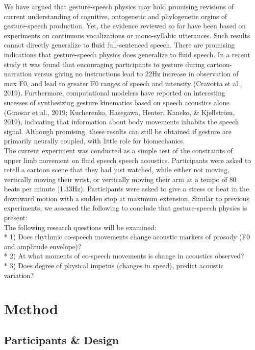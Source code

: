 \documentclass[
  man, noextraspace,floatsintext]{apa6}
\begin{document}
We have argued that gesture-speech physics may hold promising revisions of current understanding of cognitive, ontogenetic and phylogenetic orgins of gesture-speech production. Yet, the evidence reviewed so far have been based on experiments on continuous vocalizations or mono-syllabic utterances. Such results cannot directly generalize to fluid full-sentenced speech. There are promising indications that gesture-speech physics does generalize to fluid speech. In a recent study it was found that encouraging participants to gesture during cartoon-narration versus giving no instructions lead to 22Hz increase in observation of max F0, and lead to greater F0 ranges of speech and intensity (Cravotta et al., 2019). Furthermore, computational modelers have reported on interesting sucesses of synthesizing gesture kinematics based on speech acoustics alone (Ginosar et al., 2019; Kucherenko, Hasegawa, Henter, Kaneko, \& Kjellström, 2019), indicating that information about body movements inhabits the speech signal. Although promising, these results can still be obtained if gesture are primarily neurally coupled, with little role for biomechanics.\\
The current experiment was conducted as a simple test of the constraints of upper limb movement on fluid speech speech acoustics. Participants were asked to retell a cartoon scene that they had just watched, while either not moving, vertically moving their wrist, or vertically moving their arm at a tempo of 80 beats per minute (1.33Hz). Participants were asked to give a stress or beat in the downward motion with a sudden stop at maximum extension. Similar to previous experiments, we assessed the following to conclude that gesture-speech physics is present:\\
The following research questions will be examined:\\
* 1) Does rhythmic co-speech movements change acoustic markers of prosody (F0 and amplitude envelope)?\\
* 2) At what moments of co-speech movements is change in acoustics observed?\\
* 3) Does degree of physical impetus (changes in speed), predict acoustic variation?

\pagebreak

\hypertarget{method}{%
\section{Method}\label{method}}

\hypertarget{participants-design}{%
\subsection{Participants \& Design}\label{participants-design}}
\end{document}
